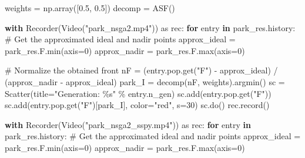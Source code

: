 \documentclass[
  authoryear,
  preprint,
  3p]{elsarticle}
\newenvironment{Shaded}{\begin{snugshade}}{\end{snugshade}}
\newcommand{\BuiltInTok}[1]{\textcolor[rgb]{0.00,0.23,0.31}{#1}}
\newcommand{\CommentTok}[1]{\textcolor[rgb]{0.37,0.37,0.37}{#1}}
\newcommand{\ControlFlowTok}[1]{\textcolor[rgb]{0.00,0.23,0.31}{\textbf{#1}}}
\newcommand{\DecValTok}[1]{\textcolor[rgb]{0.68,0.00,0.00}{#1}}
\newcommand{\FloatTok}[1]{\textcolor[rgb]{0.68,0.00,0.00}{#1}}
\newcommand{\ImportTok}[1]{\textcolor[rgb]{0.00,0.46,0.62}{#1}}
\newcommand{\KeywordTok}[1]{\textcolor[rgb]{0.00,0.23,0.31}{\textbf{#1}}}
\newcommand{\NormalTok}[1]{\textcolor[rgb]{0.00,0.23,0.31}{#1}}
\newcommand{\OperatorTok}[1]{\textcolor[rgb]{0.37,0.37,0.37}{#1}}
\newcommand{\SpecialCharTok}[1]{\textcolor[rgb]{0.37,0.37,0.37}{#1}}
\newcommand{\StringTok}[1]{\textcolor[rgb]{0.13,0.47,0.30}{#1}}
\begin{document}
\begin{Shaded}
\begin{Highlighting}[]
\NormalTok{weights }\OperatorTok{=}\NormalTok{ np.array([}\FloatTok{0.5}\NormalTok{, }\FloatTok{0.5}\NormalTok{])}
\NormalTok{decomp }\OperatorTok{=}\NormalTok{ ASF()}

\ControlFlowTok{with}\NormalTok{ Recorder(Video(}\StringTok{"park\_nsga2.mp4"}\NormalTok{)) }\ImportTok{as}\NormalTok{ rec:}
    \ControlFlowTok{for}\NormalTok{ entry }\KeywordTok{in}\NormalTok{ park\_res.history:}
        \CommentTok{\# Get the approximated ideal and nadir points}
\NormalTok{        approx\_ideal }\OperatorTok{=}\NormalTok{ park\_res.F.}\BuiltInTok{min}\NormalTok{(axis}\OperatorTok{=}\DecValTok{0}\NormalTok{)}
\NormalTok{        approx\_nadir }\OperatorTok{=}\NormalTok{ park\_res.F.}\BuiltInTok{max}\NormalTok{(axis}\OperatorTok{=}\DecValTok{0}\NormalTok{)}

        \CommentTok{\# Normalize the obtained front}
\NormalTok{        nF }\OperatorTok{=}\NormalTok{ (entry.pop.get(}\StringTok{"F"}\NormalTok{) }\OperatorTok{{-}}\NormalTok{ approx\_ideal) }\OperatorTok{/}\NormalTok{ (approx\_nadir }\OperatorTok{{-}}\NormalTok{ approx\_ideal)}
\NormalTok{        park\_I }\OperatorTok{=}\NormalTok{ decomp(nF, weights).argmin()}
\NormalTok{        sc }\OperatorTok{=}\NormalTok{ Scatter(title}\OperatorTok{=}\StringTok{"Generation: }\SpecialCharTok{\%s}\StringTok{"} \OperatorTok{\%}\NormalTok{ entry.n\_gen)}
\NormalTok{        sc.add(entry.pop.get(}\StringTok{"F"}\NormalTok{))}
\NormalTok{        sc.add(entry.pop.get(}\StringTok{"F"}\NormalTok{)[park\_I], color}\OperatorTok{=}\StringTok{"red"}\NormalTok{, s}\OperatorTok{=}\DecValTok{30}\NormalTok{)}
\NormalTok{        sc.do()}
\NormalTok{        rec.record()}


\ControlFlowTok{with}\NormalTok{ Recorder(Video(}\StringTok{"park\_nsga2\_sspy.mp4"}\NormalTok{)) }\ImportTok{as}\NormalTok{ rec:}
    \ControlFlowTok{for}\NormalTok{ entry }\KeywordTok{in}\NormalTok{ park\_res.history:}
        \CommentTok{\# Get the approximated ideal and nadir points}
\NormalTok{        approx\_ideal }\OperatorTok{=}\NormalTok{ park\_res.F.}\BuiltInTok{min}\NormalTok{(axis}\OperatorTok{=}\DecValTok{0}\NormalTok{)}
\NormalTok{        approx\_nadir }\OperatorTok{=}\NormalTok{ park\_res.F.}\BuiltInTok{max}\NormalTok{(axis}\OperatorTok{=}\DecValTok{0}\NormalTok{)}


\end{Highlighting}
\end{Shaded}
\end{document}
